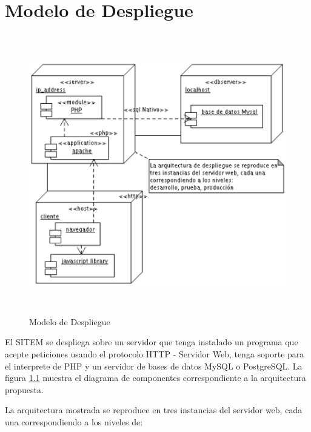 \chapter{Modelo de Despliegue}
\label{modelo_despliegue}

\begin{figure}
 \centering
 \includegraphics[width=141mm, height=122mm]{despliegue.png}
 \caption{Modelo de Despliegue}
 \label{despliegue}
\end{figure}

El SITEM se despliega sobre un servidor que tenga instalado un programa que acepte peticiones usando el protocolo HTTP - Servidor Web, tenga soporte para el interprete de PHP y un servidor de bases de datos MySQL o PostgreSQL. La figura \ref{despliegue} muestra el diagrama de componentes correspondiente a la arquitectura propuesta.

La arquitectura mostrada se reproduce en tres instancias del servidor web, cada una correspondiendo a los niveles de:

